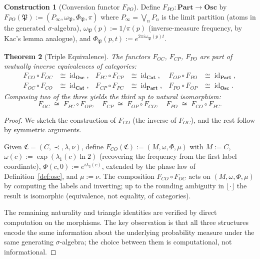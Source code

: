 \documentclass[twocolumn,11pt,a4paper]{article}
\theoremstyle{thmstyle}
\newtheorem{theorem}{Theorem}[section]
\theoremstyle{thmstyle}
\theoremstyle{definition}
\newtheorem{construction}[theorem]{Construction}
\theoremstyle{remark}
\DeclareMathOperator{\id}{id}
\newcommand{\Cat}{\mathfrak{C}}
\newcommand{\Part}{\mathfrak{P}}
\newcommand{\Cat}{\mathfrak{C}}
\begin{document}
\begin{construction}[Conversion functor $F_{PO}$]\label{constr:F-PO}
Define $F_{PO} : \mathbf{Part} \to \mathbf{Osc}$ by
$F_{PO}(\Part) := (P_{\infty}, \omega_{\Part},
\Phi_{\Part}, \pi)$ where $P_{\infty} = \bigvee_{n}
P_{n}$ is the limit partition (atoms in the generated
$\sigma$-algebra), $\omega_{\Part}(p) := 1/\pi(p)$
(inverse-measure frequency, by Kac's lemma analogue),
and $\Phi_{\Part}(p, t) := e^{2\pi i \omega_{\Part}(p) t}$.
\end{construction}

\begin{theorem}[Triple Equivalence]\label{thm:triple-equiv}
The functors $F_{OC}$, $F_{CP}$, $F_{PO}$ are part of
mutually inverse equivalences of categories:
\begin{align}
F_{CO} \circ F_{OC} &\cong \id_{\mathbf{Osc}}, &
F_{PC} \circ F_{CP} &\cong \id_{\mathbf{Cat}}, &
F_{OP} \circ F_{PO} &\cong \id_{\mathbf{Part}}, \\
F_{OC} \circ F_{CO} &\cong \id_{\mathbf{Cat}}, &
F_{CP} \circ F_{PC} &\cong \id_{\mathbf{Part}}, &
F_{PO} \circ F_{OP} &\cong \id_{\mathbf{Osc}}.
\end{align}
Composing two of the three yields the third up to
natural isomorphism:
\[
F_{OC} \;\cong\; F_{PC} \circ F_{OP},\quad
F_{CP} \;\cong\; F_{OP} \circ F_{CO},\quad
F_{PO} \;\cong\; F_{CO} \circ F_{PC}.
\]
\end{theorem}

\begin{proof}
We sketch the construction of $F_{CO}$ (the inverse of
$F_{OC}$), and the rest follow by symmetric arguments.

Given $\Cat = (C, \prec, \lambda, \nu)$, define
$F_{CO}(\Cat) := (M, \omega, \Phi, \mu)$ with $M := C$,
$\omega(c) := \exp(\lambda_{1}(c) \ln 2)$ (recovering
the frequency from the first label coordinate),
$\Phi(c, 0) := e^{i \lambda_{3}(c)}$, extended by the
phase law of Definition~\ref{def:osc}, and $\mu := \nu$.
The composition $F_{CO} \circ F_{OC}$ acts on
$(M, \omega, \Phi, \mu)$ by computing the labels and
inverting; up to the rounding ambiguity in
$\lfloor \cdot \rfloor$ the result is isomorphic
(equivalence, not equality, of categories).

The remaining naturality and triangle identities are
verified by direct computation on the morphisms.  The
key observation is that all three structures encode the
same information about the underlying probability
measure under the same generating $\sigma$-algebra; the
choice between them is computational, not informational.
\end{proof}
\end{document}

